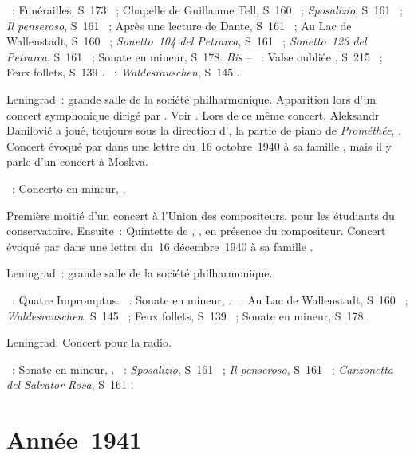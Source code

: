 \begin{description}
 \textsc{\Liszt{}}~: Funérailles, S~173 ~; Chapelle de Guillaume
 Tell, S~160 ~; \emph{Sposalizio}, S~161 ~; \emph{Il
 penseroso}, S~161 ~; Après une lecture de Dante, S~161
 ~; Au Lac de Wallenstadt, S~160 ~; \emph{Sonetto~104
 del Petrarca}, S~161 ~; \emph{Sonetto~123 del Petrarca}, S~161
 ~; Sonate en \kB mineur, S~178.
 \emph{Bis} -- \textsc{\Liszt{}}~: Valse oubliée , S~215
 ~; Feux follets, S~139 .
 \textsc{\Liszt{}}~: \emph{Waldesrauschen}, S~145 .
 \item[\DateWithWeekDay{1940-12-07}]
 Leningrad~: grande salle de la société philharmonique.
 Apparition lors d'un concert symphonique dirigé par \IMiklashevsky{}.
 Voir \citet{Lazarev20}.
 Lors de ce même concert, Aleksandr Danilovič \Kamensky{} a joué, toujours
 sous la direction d'\IMiklashevsky{}, la partie de piano de
 \emph{Prométhée},  \citep[voir aussi][p.~163]{Nekrasova08}.
 Concert évoqué par \VSofronitsky{} dans une lettre du~16 octobre~1940 à sa
 famille \citep[p.~29]{Kogan08}, mais il y parle d'un concert à Moskva.

 \textsc{\Scriabine{}}~: Concerto en \kF \Sharp mineur, .
 \item[\DateWithWeekDay{1940-12-13}]
 Première moitié d'un concert à l'\hbox{Union} des compositeurs, pour les
 étudiants du conservatoire.
 Ensuite~: Quintette de \DChostakovitch{}, , en présence du
 compositeur.
 Concert évoqué par \VSofronitsky{} dans une lettre du~16 décembre~1940 à sa
 famille \citep[p.~30]{Kogan08}.
 \item[\DateWithWeekDay{1940-12-21}]
 Leningrad~: grande salle de la société philharmonique.

 \textsc{\Schubert{}}~: Quatre Impromptus.
 \textsc{\Beethoven{}}~: Sonate en \kC \Sharp mineur,  .
 \textsc{\Liszt{}}~: Au Lac de Wallenstadt, S~160 ~;
 \emph{Waldesrauschen}, S~145 ~; Feux follets, S~139 ~;
 Sonate en \kB mineur, S~178.
 \item[\DateWithWeekDay{1940-12-26}]
 Leningrad.
 Concert pour la radio.

 \textsc{\Beethoven{}}~: Sonate en \kC \Sharp mineur,  .
 \textsc{\Liszt{}}~: \emph{Sposalizio}, S~161 ~; \emph{Il
 penseroso}, S~161 ~; \emph{Canzonetta del Salvator Rosa}, S~161
 .
\end{description}

\section{Année~1941}

